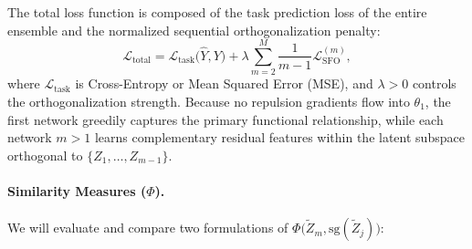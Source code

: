 \documentclass[11pt, a4paper]{article}
\begin{document}
The total loss function is composed of the task prediction loss of the entire ensemble and the normalized sequential orthogonalization penalty:
\begin{equation}
    \mathcal{L}_{\text{total}} = \mathcal{L}_{\text{task}}\big(\hat{Y}, Y\big) + \lambda \sum_{m=2}^{M} \frac{1}{m-1} \mathcal{L}_{\text{SFO}}^{(m)},
\end{equation}
where $\mathcal{L}_{\text{task}}$ is Cross-Entropy or Mean Squared Error (MSE), and $\lambda > 0$ controls the orthogonalization strength. Because no repulsion gradients flow into $\theta_1$, the first network greedily captures the primary functional relationship, while each network $m > 1$ learns complementary residual features within the latent subspace orthogonal to $\{Z_1, \dots, Z_{m-1}\}$.

\paragraph{Similarity Measures ($\Phi$).}
We will evaluate and compare two formulations of $\Phi\big(\tilde{Z}_m, \text{sg}(\tilde{Z}_j)\big)$:
\end{document}
